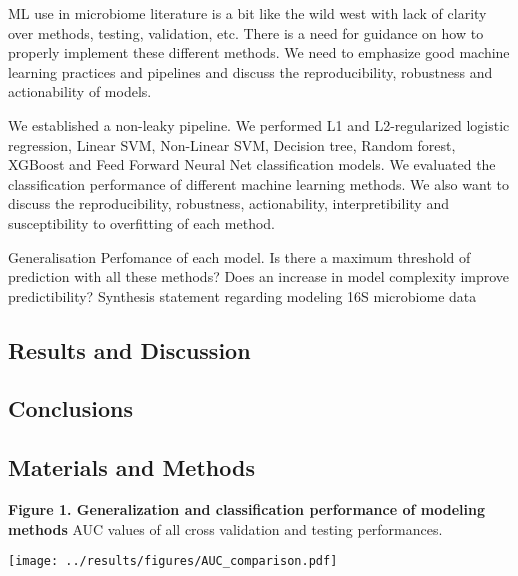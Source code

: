 \documentclass[11pt,]{article}
\begin{document}
ML use in microbiome literature is a bit like the wild west with lack of
clarity over methods, testing, validation, etc. There is a need for
guidance on how to properly implement these different methods. We need
to emphasize good machine learning practices and pipelines and discuss
the reproducibility, robustness and actionability of models.

We established a non-leaky pipeline. We performed L1 and L2-regularized
logistic regression, Linear SVM, Non-Linear SVM, Decision tree, Random
forest, XGBoost and Feed Forward Neural Net classification models. We
evaluated the classification performance of different machine learning
methods. We also want to discuss the reproducibility, robustness,
actionability, interpretibility and susceptibility to overfitting of
each method.

Generalisation Perfomance of each model. Is there a maximum threshold of
prediction with all these methods? Does an increase in model complexity
improve predictibility? Synthesis statement regarding modeling 16S
microbiome data

\subsection{Results and Discussion}\label{results-and-discussion}

\subsection{Conclusions}\label{conclusions}

\subsection{Materials and Methods}\label{materials-and-methods}

\newpage

\textbf{Figure 1. Generalization and classification performance of
modeling methods } AUC values of all cross validation and testing
performances.

\begin{center}
\texttt{[image: ../results/figures/AUC\_comparison.pdf]}
\end{center}

\end{document}
